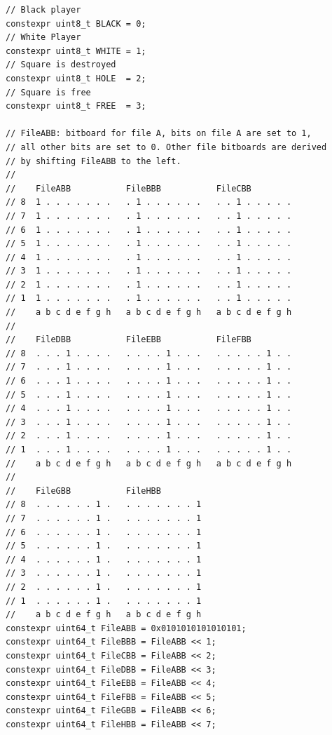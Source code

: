 \documentclass[12pt,a4paper,twoside,openright]{book}
\begin{document}
\begin{mdframed}[skipabove=\baselineskip,topline=false,rightline=false,bottomline=false,leftline=false,linewidth=1pt,linecolor=gray!40,innerleftmargin=8pt]
\begin{verbatim}
// Black player
constexpr uint8_t BLACK = 0;
// White Player
constexpr uint8_t WHITE = 1;
// Square is destroyed
constexpr uint8_t HOLE  = 2;
// Square is free
constexpr uint8_t FREE  = 3;

// FileABB: bitboard for file A, bits on file A are set to 1,
// all other bits are set to 0. Other file bitboards are derived
// by shifting FileABB to the left.
//
//    FileABB           FileBBB           FileCBB
// 8  1 . . . . . . .   . 1 . . . . . .   . . 1 . . . . .
// 7  1 . . . . . . .   . 1 . . . . . .   . . 1 . . . . .
// 6  1 . . . . . . .   . 1 . . . . . .   . . 1 . . . . .
// 5  1 . . . . . . .   . 1 . . . . . .   . . 1 . . . . .
// 4  1 . . . . . . .   . 1 . . . . . .   . . 1 . . . . .
// 3  1 . . . . . . .   . 1 . . . . . .   . . 1 . . . . .
// 2  1 . . . . . . .   . 1 . . . . . .   . . 1 . . . . .
// 1  1 . . . . . . .   . 1 . . . . . .   . . 1 . . . . .
//    a b c d e f g h   a b c d e f g h   a b c d e f g h
//
//    FileDBB           FileEBB           FileFBB
// 8  . . . 1 . . . .   . . . . 1 . . .   . . . . . 1 . .
// 7  . . . 1 . . . .   . . . . 1 . . .   . . . . . 1 . .
// 6  . . . 1 . . . .   . . . . 1 . . .   . . . . . 1 . .
// 5  . . . 1 . . . .   . . . . 1 . . .   . . . . . 1 . .
// 4  . . . 1 . . . .   . . . . 1 . . .   . . . . . 1 . .
// 3  . . . 1 . . . .   . . . . 1 . . .   . . . . . 1 . .
// 2  . . . 1 . . . .   . . . . 1 . . .   . . . . . 1 . .
// 1  . . . 1 . . . .   . . . . 1 . . .   . . . . . 1 . .
//    a b c d e f g h   a b c d e f g h   a b c d e f g h
//
//    FileGBB           FileHBB
// 8  . . . . . . 1 .   . . . . . . . 1
// 7  . . . . . . 1 .   . . . . . . . 1
// 6  . . . . . . 1 .   . . . . . . . 1
// 5  . . . . . . 1 .   . . . . . . . 1
// 4  . . . . . . 1 .   . . . . . . . 1
// 3  . . . . . . 1 .   . . . . . . . 1
// 2  . . . . . . 1 .   . . . . . . . 1
// 1  . . . . . . 1 .   . . . . . . . 1
//    a b c d e f g h   a b c d e f g h
constexpr uint64_t FileABB = 0x0101010101010101;
constexpr uint64_t FileBBB = FileABB << 1;
constexpr uint64_t FileCBB = FileABB << 2;
constexpr uint64_t FileDBB = FileABB << 3;
constexpr uint64_t FileEBB = FileABB << 4;
constexpr uint64_t FileFBB = FileABB << 5;
constexpr uint64_t FileGBB = FileABB << 6;
constexpr uint64_t FileHBB = FileABB << 7;


\end{verbatim}
\end{mdframed}
\end{document}
